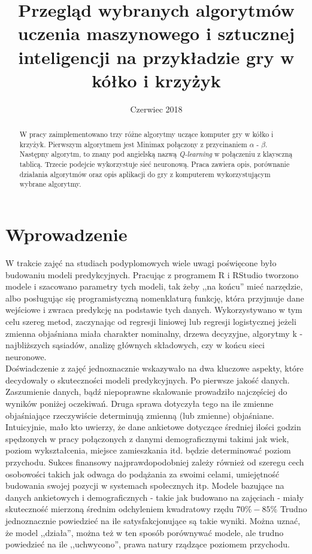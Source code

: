\documentclass[licencjacka]{pracamgr}
\title{Przegląd wybranych algorytmów uczenia maszynowego i sztucznej inteligencji na przykładzie gry w kółko i krzyżyk}
\date{Czerwiec 2018}
\begin{document}
\maketitle
\begin{abstract}
  W pracy zaimplementowano trzy różne algorytmy uczące komputer gry w kółko i krzyżyk. Pierwszym algorytmem jest Minimax połączony z przycinaniem $\alpha$ - $\beta$. Następny algorytm, to znany pod angielską nazwą \textit{Q-learning} w połączeniu z  klaysczną tablicą. Trzecie podejcie wykorzystuje sieć neuronową. Praca zawiera opis, porównanie działania algorytmów oraz opis aplikacji do gry z komputerem wykorzystującym wybrane algorytmy.
\end{abstract}

\tableofcontents


\chapter*{Wprowadzenie}

W trakcie zajęć na studiach podyplomowych wiele uwagi poświęcone było budowaniu modeli predykcyjnych. Pracując z  programem R  i RStudio tworzono modele i szacowano parametry tych modeli, tak żeby ,,na końcu'' mieć narzędzie, albo posługując się programistyczną nomenklaturą funkcję, która przyjmuje dane wejściowe i zwraca predykcję na podstawie tych danych. Wykorzystywano w tym celu szereg metod, zaczynając od regresji liniowej lub regresji logistycznej jeżeli zmienna objaśniana miała charakter nominalny, drzewa decyzyjne,  algorytmy k - najbliższych sąsiadów, analizę głównych składowych, czy w końcu sieci neuronowe.  \\

Doświadczenie z zajęć jednoznacznie wskazywało na dwa kluczowe aspekty, które decydowały o skuteczności modeli predykcyjnych. Po pierwsze jakość danych. Zaszumienie danych, bądź niepoprawne skalowanie prowadziło najczęściej do wyników poniżej oczekiwań. Druga sprawa dotyczyła tego na ile zmienne objaśniające rzeczywiście determinują zmienną (lub zmienne) objaśniane. Intuicyjnie, mało kto uwierzy, że dane ankietowe dotyczące średniej ilości godzin spędzonych w pracy połączonych z danymi demograficznymi takimi jak wiek, poziom wykształcenia, miejsce zamieszkania itd. będzie determinować poziom przychodu. Sukces finansowy najprawdopodobniej zależy również od szeregu cech osobowości takich jak odwaga do podążania za swoimi celami, umiejętność budowania swojej pozycji w systemach społecznych itp.  Modele bazujące na danych ankietowych i demograficznych - takie jak budowano na zajęciach - miały skuteczność mierzoną średnim odchyleniem kwadratowy rzędu $70\% - 85\%$  Trudno jednoznacznie powiedzieć na ile satysfakcjonujące są takie wyniki. Można uznać, że model ,,działa'', można też w ten sposób porównywać modele, ale trudno powiedzieć na ile ,,uchwycono'',  prawa natury rządzące poziomem przychodu.\\
 
\end{document}
